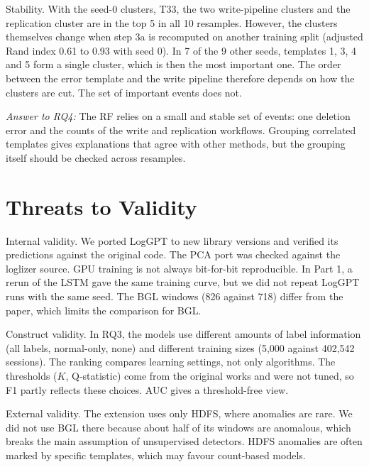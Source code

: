 \documentclass[10pt, conference]{IEEEtran}
\renewcommand{\paragraph}[1]{\noindent\textsf{#1}.}
\begin{document}
\paragraph{Stability} With the seed-0 clusters, T33, the two write-pipeline clusters and the replication cluster are in the top 5 in all 10 resamples. However, the clusters themselves change when step 3a is recomputed on another training split (adjusted Rand index 0.61 to 0.93 with seed 0). In 7 of the 9 other seeds, templates 1, 3, 4 and 5 form a single cluster, which is then the most important one. The order between the error template and the write pipeline therefore depends on how the clusters are cut. The set of important events does not.

\textit{Answer to RQ4:} The RF relies on a small and stable set of events: one deletion error and the counts of the write and replication workflows. Grouping correlated templates gives explanations that agree with other methods, but the grouping itself should be checked across resamples.

\section{Threats to Validity}
\label{sec:threats}

\paragraph{Internal validity} We ported LogGPT to new library versions and verified its predictions against the original code. The PCA port was checked against the loglizer source. GPU training is not always bit-for-bit reproducible. In Part 1, a rerun of the LSTM gave the same training curve, but we did not repeat LogGPT runs with the same seed. The BGL windows (826 against 718) differ from the paper, which limits the comparison for BGL.

\paragraph{Construct validity} In RQ3, the models use different amounts of label information (all labels, normal-only, none) and different training sizes (5,000 against 402,542 sessions). The ranking compares learning settings, not only algorithms. The thresholds ($K$, Q-statistic) come from the original works and were not tuned, so F1 partly reflects these choices. AUC gives a threshold-free view.

\paragraph{External validity} The extension uses only HDFS, where anomalies are rare. We did not use BGL there because about half of its windows are anomalous, which breaks the main assumption of unsupervised detectors. HDFS anomalies are often marked by specific templates, which may favour count-based models.
\end{document}
